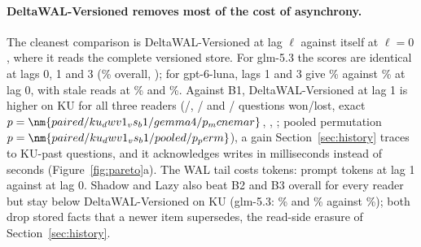 \paragraph{DeltaWAL-Versioned removes most of the cost of asynchrony.}
The cleanest comparison is DeltaWAL-Versioned at lag $\ell$ against itself at $\ell=0$, where it reads the complete versioned store. For glm-5.3 the scores are identical at lags 0, 1 and 3 (\% overall, ); for gpt-6-luna, lags 1 and 3 give \% against \% at lag 0, with stale reads at \% and \%. Against B1, DeltaWAL-Versioned at lag 1 is higher on KU for all three readers (/, / and / questions won/lost, exact $p=\nm{paired/ku_dwv1_vs_b1/gemma4/p_mcnemar}$, , ; pooled permutation $p=\nm{paired/ku_dwv1_vs_b1/pooled/p_perm}$), a gain Section~\ref{sec:history} traces to KU-past questions, and it acknowledges writes in milliseconds instead of seconds (Figure~\ref{fig:pareto}a). The WAL tail costs tokens:  prompt tokens at lag 1 against  at lag 0. Shadow and Lazy also beat B2 and B3 overall for every reader but stay below DeltaWAL-Versioned on KU (glm-5.3: \% and \% against \%); both drop stored facts that a newer item supersedes, the read-side erasure of Section~\ref{sec:history}.

